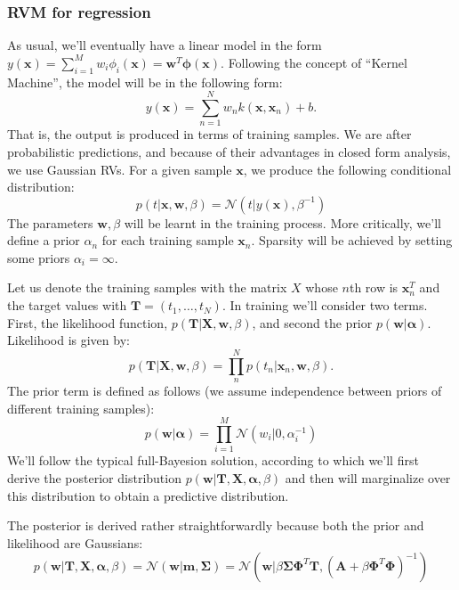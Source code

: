 \documentclass[a4paper]{article}
\newcommand{\mb}{\mathbf}
\newcommand{\bs}{\boldsymbol}
\begin{document}
\subsubsection{RVM for regression}
As usual, we'll eventually have a linear model in the form $y(\mb{x}) = \sum\limits_{i=1}^{M}w_i\phi_i(\mb{x}) = \mb{w}^T\bs{\phi}(\mb{x})$. Following the concept of ``Kernel Machine'', the model will be in the following form:
%
\begin{equation}
y(\mb{x}) = \sum\limits_{n=1}^N w_n k(\mb{x}, \mb{x}_n)+b.
\end{equation}
%
That is, the output is produced in terms of training samples. We are after probabilistic predictions, and because of their advantages in closed form analysis, we use Gaussian RVs. For a given sample $\mb{x}$, we produce the following conditional distribution:
%
\begin{equation}
p(t|\mb{x}, \mb{w}, \beta) = \mathcal{N}(t|y(\mb{x}), \beta^{-1})
\end{equation}
%
The parameters $\mb{w},\beta$ will be learnt in the training process.	More critically, we'll define a prior $\alpha_n$ for each training sample $\mb{x}_n$. Sparsity will be achieved by setting some priors $\alpha_i=\infty$.

Let us denote the training samples with the matrix $X$ whose $n$th row is $\mb{x}_n^T$ and the target values with $\mb{T}=(t_1,\hdots, t_N)$. In training we'll consider two terms. First, the likelihood function, $p(\mb{T}|\mb{X},\mb{w},\beta)$, and second the prior $p(\mb{w}|\bs{\alpha})$. Likelihood is given by:
%
\begin{equation}
p(\mb{T}|\mb{X}, \mb{w}, \beta) = \prod\limits_n^{N} p(t_n|\mb{x}_n, \mb{w}, \beta).
\end{equation}
%
The prior term is defined as follows (we assume independence between priors of different training samples):
%
\begin{equation}
p(\mb{w}|\bs{\alpha}) = \prod\limits_{i=1}^M \mathcal{N}(w_i|0, \alpha_i^{-1})
\end{equation}
%
%
%
%
%
We'll follow the typical full-Bayesion solution, according to which we'll first derive the posterior distribution $p(\mb{w}|\mb{T},\mb{X}, \bs{\alpha}, \beta)$ and then will marginalize over this distribution to obtain a predictive distribution.

The posterior is derived rather straightforwardly because both the prior and likelihood are Gaussians:
%
\begin{equation}
p(\mb{w}|\mb{T,X},\bs{\alpha}, \beta) = \mathcal{N}(\mb{w|m,\Sigma})=\mathcal{N}(\mb{w}|\beta \mb{\Sigma \Phi}^T\mb{T}, (\mb{A}+\beta\mb{\Phi}^T\mb{\Phi})^{-1})
\end{equation}
\end{document}

